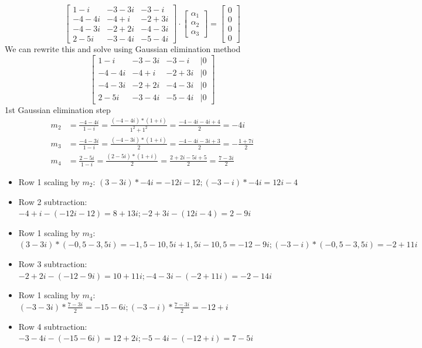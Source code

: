\documentclass{article}
\begin{document}
            \[
                \begin{bmatrix}
                    1 - i & -3 - 3i & -3 - i\\
                    -4 - 4i & -4 + i & -2 + 3i\\
                    -4 - 3i & -2 + 2i & -4 - 3i\\
                    2 - 5i & -3 - 4i & -5 - 4i
                \end{bmatrix}
                \cdot 
                \begin{bmatrix}
                    \alpha_1\\
                    \alpha_2\\
                    \alpha_3
                \end{bmatrix}
                = 
                \begin{bmatrix}
                    0\\
                    0\\
                    0\\
                    0
                \end{bmatrix}
            \]
            We can rewrite this and solve using Gaussian elimination method
            \[
                \begin{bmatrix}
                    1 - i & -3 - 3i & -3 - i & | 0\\
                    -4 - 4i & -4 + i & -2 + 3i & | 0\\
                    -4 - 3i & -2 + 2i & -4 - 3i & | 0\\
                    2 - 5i & -3 - 4i & -5 - 4i & | 0
                \end{bmatrix}
            \]
            1st Gaussian elimination step
            \begin{align*}
                m_2 &= \frac{-4-4i}{1-i} = \frac{(-4-4i)*(1+i)}{1^2+1^2} = \frac{-4-4i-4i+4}{2} = -4i \\
                m_3 &= \frac{-4-3i}{1-i} = \frac{(-4-3i)*(1+i)}{2} = \frac{-4-4i-3i+3}{2} = -\frac{1+7i}{2} \\
                m_4 &= \frac{2-5i}{1-i} = \frac{(2-5i)*(1+i)}{2} = \frac{2+2i-5i+5}{2} = \frac{7-3i}{2}
            \end{align*}
            \begin{itemize}
                \item Row 1 scaling by $m_2$: $(3-3i) * -4i = -12i-12; (-3 - i) * -4i = 12i-4$
                \item Row 2 subtraction: $-4+i - (-12i-12) = 8+13i; -2+3i - (12i-4) = 2-9i$
                \item Row 1 scaling by $m_3$: $(3-3i)*(-0,5-3,5i) = -1,5-10,5i+1,5i-10,5 = -12-9i; (-3-i)*(-0,5-3,5i) = -2+11i$
                \item Row 3 subtraction: $-2+2i - (-12-9i) = 10+11i ; -4-3i - (-2+11i) = -2-14i$
                \item Row 1 scaling by $m_4$: $(-3-3i) * \frac{7-3i}{2} = -15-6i; (-3-i) * \frac{7-3i}{2} = -12+i$
                \item Row 4 subtraction: $-3-4i - (-15-6i) = 12+2i; -5-4i - (-12+i) = 7-5i$
            \end{itemize}
\end{document}
